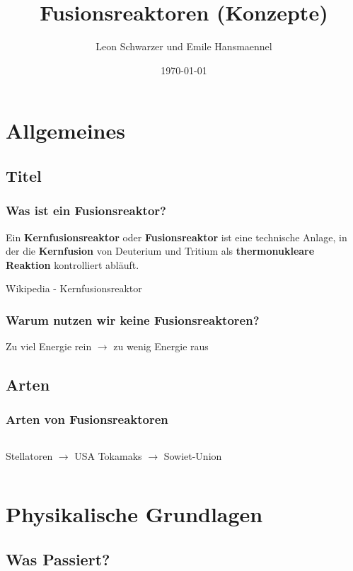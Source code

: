 \documentclass[aspectratio=169]{beamer}
\title{Fusionsreaktoren (Konzepte)}
\subtitle{}
\author{Leon Schwarzer und Emile Hansmaennel}
\institute{Theodor-Fliedner-Gymnasium}
\date{\today}
\begin{document}
  \begin{frame}
    \titlepage
  \end{frame}

  \section{Allgemeines}
    \subsection{Titel}

      \begin{frame}
        \frametitle{Was ist ein Fusionsreaktor?}
        Ein \textbf{Kernfusionsreaktor} oder \textbf{Fusionsreaktor} ist eine
        technische Anlage, in der die \textbf{Kernfusion} von Deuterium und Tritium als
        \textbf{thermonukleare Reaktion} kontrolliert abläuft.
        \par
        \raggedleft
        Wikipedia - Kernfusionsreaktor
      \end{frame}

      \begin{frame}
        \frametitle{Warum nutzen wir keine Fusionsreaktoren?}
        \center
        Zu viel Energie rein \( \rightarrow \) zu wenig Energie raus
      \end{frame}

    \subsection{Arten}

      \begin{frame}
        \frametitle{Arten von Fusionsreaktoren}
        \begin{columns}
          \center
          Stellatoren \( \rightarrow \) USA
          \bigskip
          \center
          Tokamaks \( \rightarrow \) Sowiet-Union
        \end{columns}
      \end{frame}

  \section{Physikalische Grundlagen}

    \subsection{Was Passiert?}
\end{document}
